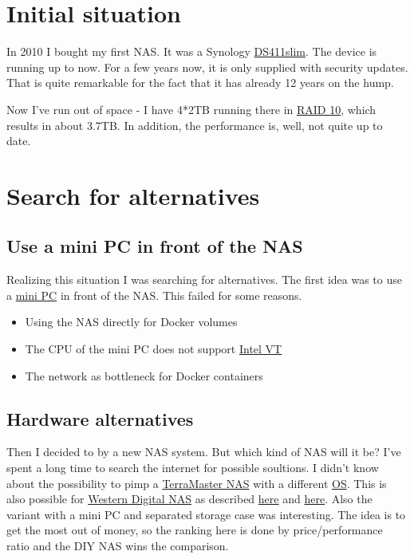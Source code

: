 \section{Initial situation}

In 2010 I bought my first \gls{NAS}. It was a \gls{Synology}
\href{https://global.download.synology.com/download/Document/Hardware/DataSheet/DiskStation/11-year/DS411slim/ger/Synology_DS411slim_Data_Sheet_ger.pdf}{DS411slim}.
The device is running up to now. For a few years now, it is only supplied with
security updates. That is quite remarkable for the fact that it has already 12
years on the hump.
\bigbreak

Now I've run out of space - I have 4*2TB running there in \href{https://en.wikipedia.org/wiki/RAID}{RAID 10},
which results in about 3.7TB. In addition, the performance is, well, not quite up
to date.

\section{Search for alternatives}

\subsection{Use a mini PC in front of the NAS}

Realizing this situation I was searching for alternatives. The first idea was
to use a \href{https://www.zotac.com/at/product/mini_pcs/id41-plus}{mini PC} in
front of the \gls{NAS}. This failed for some reasons.

\begin{itemize}
    \item Using the \gls{NAS} directly for \gls{Docker} volumes
    \item The CPU of the mini PC does not support \href{https://en.wikipedia.org/wiki/X86_virtualization}{Intel VT}
    \item The network as bottleneck for \gls{Docker} containers
\end{itemize}

\subsection{Hardware alternatives}

Then I decided to by a new \gls{NAS} system. But which kind of \gls{NAS} will
it be? I've spent a long time to search the internet for possible soultions.
I didn't know about the possibility to pimp a \href{https://www.terra-master.com}{TerraMaster \gls{NAS}}
with a different \href{https://www.youtube.com/watch?v=f9Fh8XgREJ0}{OS}. This
is also possible for \href{https://www.westerndigital.com}{Western Digital \gls{NAS}}
as described \href{https://community.wd.com/t/firmware-freenas-on-pr4100-updated/218730/11}{here}
and \href{https://forum.openmediavault.org/index.php?thread/37009-can-i-install-omv-on-a-wd-nas/}{here}.
Also the variant with a mini PC and separated storage case was interesting. The
idea is to get the most out of money, so the ranking here is done by
price/performance ratio and the DIY \gls{NAS} wins the comparison.

